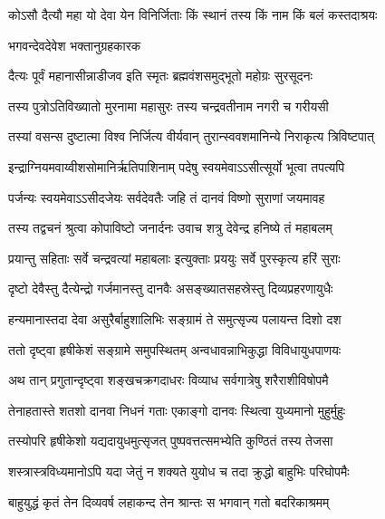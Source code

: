 
\twolineshloka
{कोऽसौ दैत्यौ महा यो देवा येन विनिर्जिताः}
{किं स्थानं तस्य किं नाम किं बलं कस्तदाश्रयः} %



\onelineshloka
{भगवन्देवदेवेश भक्तानुग्रहकारक} %

\twolineshloka
{दैत्यः पूर्वं महानासीन्नाडीजव इति स्मृतः}
{ब्रह्मवंशसमुद्भूतो महोग्रः सुरसूदनः} %

\twolineshloka
{तस्य पुत्रोऽतिविख्यातो मुरनामा महासुरः}
{तस्य चन्द्रवतीनाम नगरी च गरीयसी} %

\twolineshloka
{तस्यां वसन्स दुष्टात्मा विश्व निर्जित्य वीर्यवान्}
{तुरान्स्ववशमानिन्ये निराकृत्य त्रिविष्टपात्} %

\twolineshloka
{इन्द्राग्नियमवाय्वीशसोमानिर्ऋतिपाशिनाम्}
{पदेषु स्वयमेवाऽऽसीत्सूर्यो भूत्वा तपत्यपि} %

\twolineshloka
{पर्जन्यः स्वयमेवाऽऽसीदजेयः सर्वदेवतैः}
{जहि तं दानवं विष्णो सुराणां जयमावह} %

\twolineshloka
{तस्य तद्वचनं श्रुत्वा कोपाविष्टो जनार्दनः}
{उवाच शत्रु देवेन्द्र हनिष्ये तं महाबलम्} %

\twolineshloka
{प्रयान्तु सहिताः सर्वे चन्द्रवत्यां महाबलाः}
{इत्युक्ताः प्रययुः सर्वे पुरस्कृत्य हरिं सुराः} %

\twolineshloka
{दृष्टो देवैस्तु दैत्येन्द्रो गर्जमानस्तु दानवैः}
{असङ्ख्यातसहस्रेस्तु दिव्यप्रहरणायुधैः} %

\twolineshloka
{हन्यमानास्तदा देवा असुरैर्बाहुशालिभिः}
{सङ्ग्रामं ते समुत्सृज्य पलायन्त दिशो दश} %

\twolineshloka
{ततो दृष्ट्वा हृषीकेशं सङ्ग्रामे समुपस्थितम्}
{अन्वधावन्नाभिकुद्धा विविधायुधपाणयः} %

\twolineshloka
{अथ तान् प्रगुतान्दृष्ट्वा शङ्खचक्रगदाधरः}
{विव्याध सर्वगात्रेषु शरैराशीविषोपमै} %

\twolineshloka
{तेनाहतास्ते शतशो दानवा निधनं गताः}
{एकाङ्गो दानवः स्थित्वा युध्यमानो मुहुर्मुहुः} %

\twolineshloka
{तस्योपरि हृषीकेशो यद्यदायुधमुत्सृजत्}
{पुष्पवत्तत्समभ्येति कुण्ठितं तस्य तेजसा} %

\twolineshloka
{शस्त्रास्त्रविध्यमानोऽपि यदा जेतुं न शक्यते}
{युयोध च तदा क्रुद्धो बाहुभिः परिघोपमैः} %

\twolineshloka
{बाहुयुद्धं कृतं तेन दिव्यवर्ष लहाकन्द}
{तेन श्रान्तः स भगवान् गतो बदरिकाश्रमम्} %

